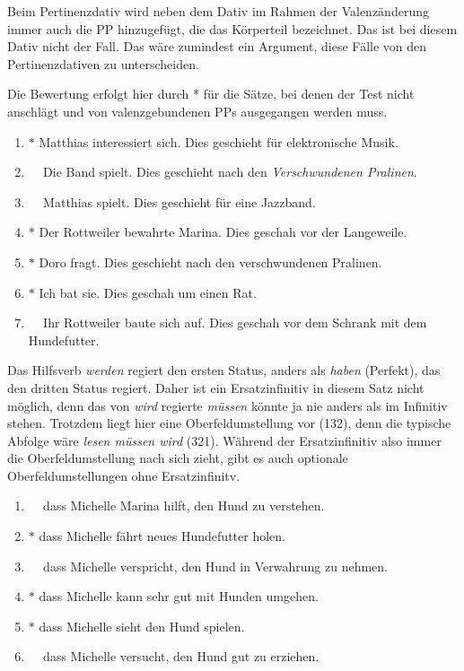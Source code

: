 
Beim Pertinenzdativ wird neben dem Dativ im Rahmen der Valenzänderung immer auch die PP hinzugefügt, die das Körperteil bezeichnet.
Das ist bei diesem Dativ nicht der Fall.
Das wäre zumindest ein Argument, diese Fälle von den Pertinenzdativen zu unterscheiden.


Die Bewertung erfolgt hier durch * für die Sätze, bei denen der Test nicht anschlägt und von valenzgebundenen PPs ausgegangen werden muss.

\begin{enumerate}\Lf
  \item $*$ Matthias interessiert sich. Dies geschieht für elektronische Musik.
  \item $\phantom{*}$ Die Band spielt. Dies geschieht nach den \textit{Verschwundenen Pralinen}.
  \item $\phantom{*}$ Matthias spielt. Dies geschieht für eine Jazzband.
  \item $*$ Der Rottweiler bewahrte Marina. Dies geschah vor der Langeweile.
  \item $*$ Doro fragt. Dies geschieht nach den verschwundenen Pralinen.
  \item $*$ Ich bat sie. Dies geschah um einen Rat.
  \item $\phantom{*}$ Ihr Rottweiler baute sich auf. Dies geschah vor dem Schrank mit dem Hundefutter.
\end{enumerate}


Das Hilfsverb \textit{werden} regiert den ersten Status, anders als \textit{haben} (Perfekt), das den dritten Status regiert.
Daher ist ein Ersatzinfinitiv in diesem Satz nicht möglich, denn das von \textit{wird} regierte \textit{müssen} könnte ja nie anders als im Infinitiv stehen.
Trotzdem liegt hier eine Oberfeldumstellung vor (132), denn die typische Abfolge wäre \textit{lesen müssen wird} (321).
Während der Ersatzinfinitiv also immer die Oberfeldumstellung nach sich zieht, gibt es auch optionale Oberfeldumstellungen ohne Ersatzinfinitv.


\begin{enumerate}\Lf
  \item $\phantom{*}$ dass Michelle Marina hilft, den Hund zu verstehen.
  \item $*$ dass Michelle fährt neues Hundefutter holen.
  \item $\phantom{*}$ dass Michelle verspricht, den Hund in Verwahrung zu nehmen.
  \item $*$ dass Michelle kann sehr gut mit Hunden umgehen.
  \item $*$ dass Michelle sieht den Hund spielen.
  \item $\phantom{*}$ dass Michelle versucht, den Hund gut zu erziehen.
\end{enumerate}

